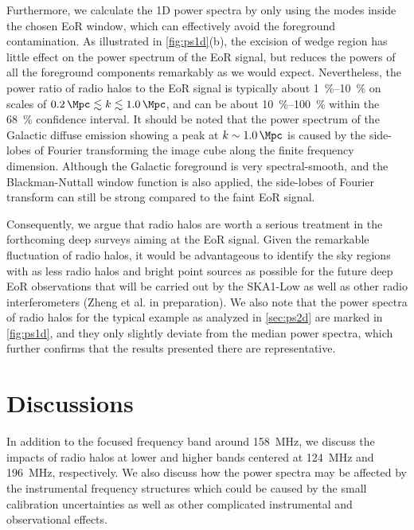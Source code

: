 \documentclass[modern]{aastex62}
\begin{document}
Furthermore, we calculate the 1D power spectra by only using the modes
inside the chosen EoR window, which can effectively avoid the foreground
contamination.
As illustrated in \autoref{fig:ps1d}(b), the excision of wedge region
has little effect on the power spectrum of the EoR signal, but reduces
the powers of all the foreground components remarkably as we would expect.
Nevertheless, the power ratio of radio halos to the EoR signal is
typically about \SIrange[range-units=repeat]{1}{10}{\percent} on scales
of $\SI{0.2}{\per\Mpc} \lesssim k \lesssim \SI{1.0}{\per\Mpc}$,
and can be about \SIrange[range-units=repeat]{10}{100}{\percent} within
the \SI{68}{\percent} confidence interval.
It should be noted that the power spectrum of the Galactic diffuse
emission showing a peak at $k \sim \SI{1.0}{\per\Mpc}$ is caused by the
side-lobes of Fourier transforming the image cube along the finite
frequency dimension.
Although the Galactic foreground is very spectral-smooth, and the
Blackman-Nuttall window function is also applied, the side-lobes of Fourier
transform can still be strong compared to the faint EoR signal.

Consequently, we argue that radio halos are worth a serious treatment
in the forthcoming deep surveys aiming at the EoR signal.
Given the remarkable fluctuation of radio halos, it would be advantageous
to identify the sky regions with as less radio halos and bright point
sources as possible for the future deep EoR observations that will be
carried out by the SKA1-Low as well as other radio interferometers
(Zheng et al. in preparation).
We also note that the power spectra of radio halos for the typical
example as analyzed in \autoref{sec:ps2d} are marked in \autoref{fig:ps1d},
and they only slightly deviate from the median power spectra, which
further confirms that the results presented there are representative.


\section{Discussions}
\label{sec:discussions}

In addition to the focused frequency band around \SI{158}{\MHz}, we
discuss the impacts of radio halos at lower and higher bands centered
at \SI{124}{\MHz} and \SI{196}{\MHz}, respectively.
We also discuss how the power spectra may be affected by the instrumental
frequency structures which could be caused by the small calibration
uncertainties as well as other complicated instrumental and observational
effects.
\end{document}
